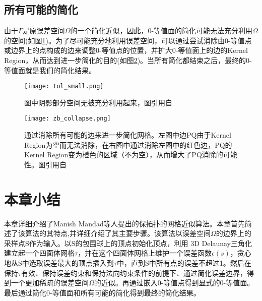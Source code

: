 \subsection{所有可能的简化}
由于$\Gamma$是原误差空间$\Omega$的一个简化近似，因此，0-等值面的简化可能无法充分利用$\Omega$的空间(如图\ref{fig:tol-small})。为了尽可能充分地利用误差空间，可以通过尝试消除由0-等值点或边界上的点构成的边来调整0-等值点的位置，并扩大0-等值面上的边的Kernel Region，从而达到进一步简化的目的(如图\ref{fig:all-edges-collapse})。当所有简化都结束之后，最终的0-等值面就是我们的简化结果。

\begin{figure}[htbp]
    \centering
    \texttt{[image: tol\_small.png]}
    \caption[无法利用的误差空间]{图中阴影部分空间无被充分利用起来，图引用自\cite{isotopic-appro}}
    \label{fig:tol-small}
\end{figure}

\begin{figure}[htbp]
    \centering
    \texttt{[image: zb\_collapse.png]}
    \caption[所有可能的边的消除]{通过消除所有可能的边来进一步简化网格。左图中边PQ由于Kernel Region为空而无法消除，在右图中通过消除左图中的红色边，PQ的Kernel Region变为橙色的区域（不为空），从而增大了PQ消除的可能性。图引用自\cite{isotopic-appro}}
    \label{fig:all-edges-collapse}
\end{figure}

\section{本章小结}
本章详细介绍了Manish Mandad等人提出的保拓扑的网格近似算法\cite{isotopic-appro}。本章首先简述了该算法的其特点,并详细介绍了其主要步骤。该算法以误差空间$\Omega$的边界上的采样点S作为输入。以S的包围球上的顶点初始化顶点，利用 3D Delaunay三角化建立起一个四面体网格$\tau$，并在这个四面体网格上维护一个误差函数$\epsilon(s)$，贪心地从S中选取误差最大的顶点插入到$\tau$中，直到S中所有点的误差不超过1。然后在保持$\tau$有效、保持误差约束和保持法向约束条件的前提下、通过简化误差边界，得到一个更加稀疏的误差空间$\Omega$的近似。再通过嵌入0-等值点得到显式的0-等值面。最后通过简化0-等值面和所有可能的简化得到最终的简化结果。


